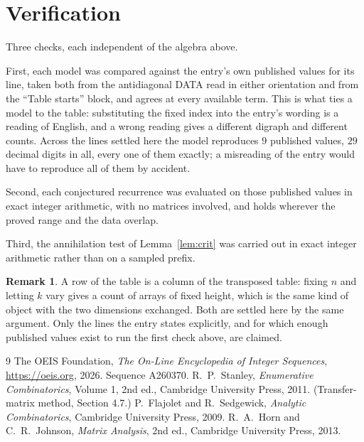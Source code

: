 \documentclass[11pt,a4paper]{article}
\theoremstyle{plain}
\theoremstyle{definition}
\newtheorem{remark}[theorem]{Remark}
\begin{document}
\section{Verification}

Three checks, each independent of the algebra above.

First, each model was compared against the entry's own published values for its line, taken
both from the antidiagonal DATA read in either orientation and from the ``Table starts''
block, and agrees at every available term. This is what ties a model to the table:
substituting the fixed index into the entry's wording is a reading of English, and a wrong
reading gives a different digraph and different counts. Across the lines settled here the
model reproduces $9$ published values, $29$ decimal digits in all, every one of
them exactly; a misreading of the entry would have to reproduce all of them by accident.

Second, each conjectured recurrence was evaluated on those published values in exact
integer arithmetic, with no matrices involved, and holds wherever the proved range and the
data overlap.

Third, the annihilation test of Lemma~\ref{lem:crit} was carried out in exact integer
arithmetic rather than on a sampled prefix.

\begin{remark}
A row of the table is a column of the transposed table: fixing $n$ and letting $k$ vary gives a
count of arrays of fixed height, which is the same kind of object with the two dimensions
exchanged. Both are settled here by the same argument. Only the lines the entry states
explicitly, and for which enough published values exist to run the first check above, are
claimed.
\end{remark}

\begin{thebibliography}{9}
 The OEIS Foundation, \emph{The On-Line Encyclopedia of Integer
Sequences}, \url{https://oeis.org}, 2026. Sequence A260370.
 R.~P.~Stanley, \emph{Enumerative Combinatorics}, Volume 1, 2nd ed.,
Cambridge University Press, 2011. (Transfer-matrix method, Section 4.7.)
 P.~Flajolet and R.~Sedgewick, \emph{Analytic Combinatorics}, Cambridge
University Press, 2009.
 R.~A.~Horn and C.~R.~Johnson, \emph{Matrix Analysis}, 2nd ed., Cambridge
University Press, 2013.
\end{thebibliography}
\end{document}
